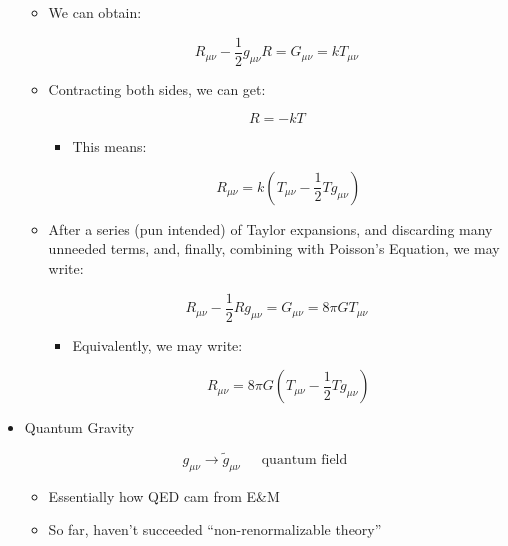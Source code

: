 \begin{itemize}
\begin{itemize}
\begin{itemize}
        \end{itemize}

      \item We can obtain:

        $$R_{\mu\nu}-\frac{1}{2}g_{\mu\nu}R=G_{\mu\nu}=kT_{\mu\nu}$$

      \item Contracting both sides, we can get:

        $$R=-kT$$

        \begin{itemize}

          \item This means:

            $$R_{\mu\nu}=k\left( T_{\mu\nu}-\frac{1}{2}Tg_{\mu\nu} \right)$$

        \end{itemize}

      \item After a series (pun intended) of Taylor expansions, and discarding many unneeded terms, and, finally, combining with Poisson's Equation, we may write:

        $$R_{\mu\nu}-\frac{1}{2}Rg_{\mu\nu}=G_{\mu\nu}=8\pi GT_{\mu\nu}$$

        \begin{itemize}

          \item Equivalently, we may write:

            $$R_{\mu\nu}=8\pi G\left( T_{\mu\nu}-\frac{1}{2}Tg_{\mu\nu} \right)$$

        \end{itemize}

    \end{itemize}

  \item Quantum Gravity

    $$g_{\mu\nu}\to \tilde{g}_{\mu\nu}\,\quad\text{ quantum field}$$

    \begin{itemize}
        
      \item Essentially how QED cam from E\&M

      \item So far, haven't succeeded ``non-renormalizable theory''

    \end{itemize}

\end{itemize}




